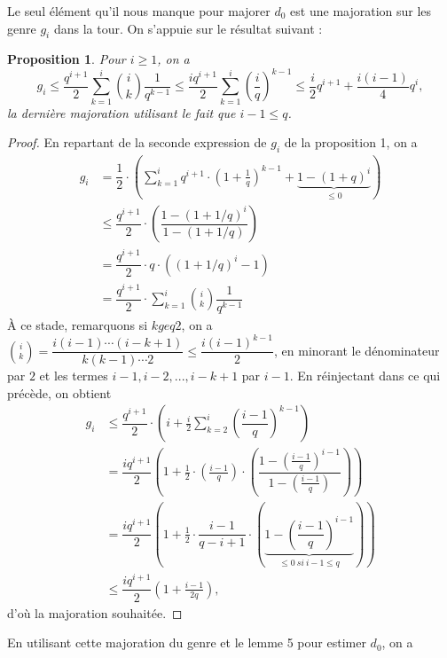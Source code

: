 \documentclass[10pt]{article}
\newtheorem{prop1}{Proposition}[]
\newcommand{\cd}{\cdot}
\begin{document}
Le seul élément qu'il nous manque pour majorer $d_0$ est une majoration sur les genre $g_i$ dans la tour. On s'appuie sur le résultat suivant :

\begin{prop1}\label{prop:maj_genus_herm}
Pour $i \geq 1$, on a
\[g_i \leq \dfrac{q^{i+1}}{2} \sum\limits_{k=1}^i \binom{i}{k} \dfrac{1}{q^{k-1}} \leq \dfrac{iq^{i+1}}{2} \sum\limits_{k=1}^i \left(\dfrac{i}{q}\right)^{k-1} \leq \dfrac{i}{2}q^{i+1} + \dfrac{i(i-1)}{4}q^i,\]
la dernière majoration utilisant le fait que $i-1 \leq q$.
\end{prop1}

\begin{proof}
En repartant de la seconde expression de $g_i$ de la proposition 1, on a 
\begin{align*}
g_i  &=\dfrac{1}{2} \cd \left(\sum\limits_{k=1}^i q^{i+1} \cd \left(1+\frac{1}{q}\right)^{k-1} +\underbrace{1 -(1+q)^i}_{\leq 0}\right) \\
	&\leq \dfrac{q^{i+1}}{2} \cd \left(\dfrac{1-(1+1/q)^i}{1-(1+1/q)}\right) \\
	& = \dfrac{q^{i+1}}{2} \cd q \cd ((1+1/q)^i-1) \\
	& = \dfrac{q^{i+1}}{2} \cd \sum\limits_{k=1}^i \binom{i}{k} \dfrac{1}{q^{k-1}}
\end{align*}
À ce stade, remarquons si $k geq 2$, on a $\binom{i}{k} = \dfrac{i(i-1) \cdots (i-k+1)}{k(k-1) \cdots 2} \leq \dfrac{i(i-1)^{k-1}}{2}$, en minorant le dénominateur par $2$ et les termes $i-1,i-2,...,i-k+1$ par $i-1$. En réinjectant dans ce qui précède, on obtient
\begin{align*}
g_i &\leq \dfrac{q^{i+1}}{2} \cd \left( i + \frac{i}{2} \sum\limits_{k=2}^i \left(\dfrac{i-1}{q}\right)^{k-1}\right) \\
	&= \dfrac{iq^{i+1}}{2} \left( 1 + \frac{1}{2} \cd \left(\frac{i-1}{q}\right) \cd \left(\dfrac{1-(\frac{i-1}{q})^{i-1}}{1-(\frac{i-1}{q})}\right)\right) \\
		&= \dfrac{iq^{i+1}}{2} \left( 1 + \frac{1}{2} \cd \dfrac{i-1}{q-i+1} \cd \left(\underbrace{1- \left(\dfrac{i-1}{q}\right)^{i-1}}_{\leq 0 \ si \ i-1 \leq q}\right)\right) \\
	& \leq \dfrac{iq^{i+1}}{2} \left( 1 + \frac{i-1}{2q}\right),
\end{align*}
d'où la majoration souhaitée.
\end{proof}

En utilisant cette majoration du genre et le lemme 5 pour estimer $d_0$, on a 
\end{document}
